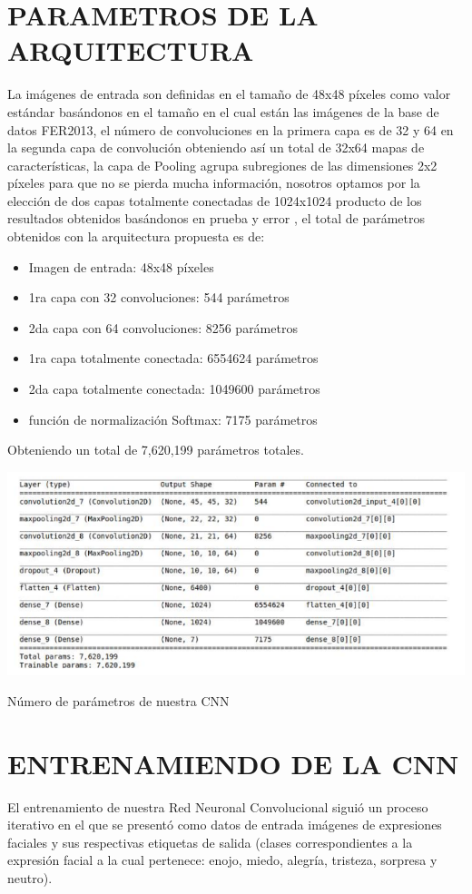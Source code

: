 \section{PARAMETROS DE LA ARQUITECTURA}
La imágenes de entrada son definidas en el tamaño de 48x48 píxeles como valor
estándar basándonos en el tamaño en el cual están las imágenes de la base de datos
FER2013, el número de convoluciones en la primera capa es de 32 y 64 en la segunda
capa de convolución obteniendo así un total de 32x64 mapas de características, la capa
de Pooling agrupa subregiones de las dimensiones 2x2 píxeles para que no se pierda
mucha información, nosotros optamos por la elección de dos capas totalmente conectadas
de 1024x1024 producto de los resultados obtenidos basándonos en prueba y error , el total
de parámetros obtenidos con la arquitectura propuesta es de:

\begin{itemize}
\item Imagen de entrada: 48x48 píxeles
\item 1ra capa con 32 convoluciones: 544 parámetros
\item 2da capa con 64 convoluciones: 8256 parámetros
\item 1ra capa totalmente conectada: 6554624 parámetros
\item 2da capa totalmente conectada: 1049600 parámetros
\item función de normalización Softmax: 7175 parámetros
\end{itemize}
Obteniendo un total de 7,620,199 parámetros totales.

\begin{table}[H]
    \centering
    \includegraphics[width=140mm]{./Imagenes/parametros.png} 
    \caption{Número de parámetros de nuestra CNN}
    \label{tab:parametros}
\end{table}

	
\section{ENTRENAMIENDO DE LA CNN}
El entrenamiento de nuestra Red Neuronal Convolucional siguió un proceso
iterativo en el que se presentó como datos de entrada imágenes de expresiones faciales y
sus respectivas etiquetas de salida (clases correspondientes a la expresión facial a la cual
pertenece: enojo, miedo, alegría, tristeza, sorpresa y neutro).

